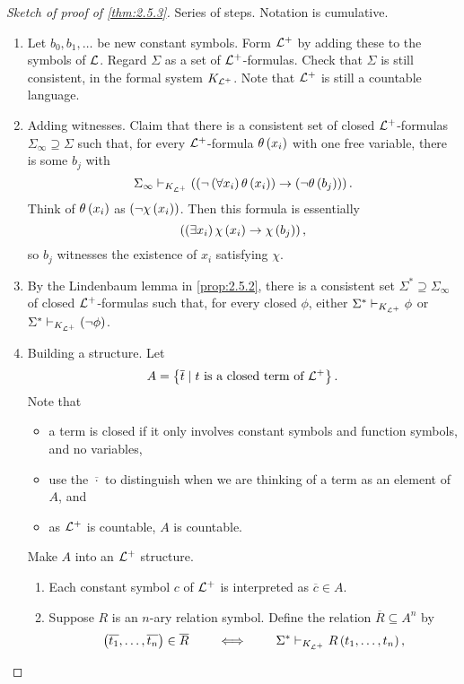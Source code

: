 \begin{proof}[Sketch of proof of \ref{thm:2.5.3}]
Series of steps. Notation is cumulative.
\begin{enumerate}[leftmargin=0.5in, label=Step \arabic*.]
\item Let $ b_0, b_1, \dots $ be new constant symbols. Form $ \mathcal{L}^+ $ by adding these to the symbols of $ \mathcal{L} $. Regard $ \Sigma $ as a set of $ \mathcal{L}^+ $-formulas. Check that $ \Sigma $ is still consistent, in the formal system $ K_{\mathcal{L}^+} $. Note that $ \mathcal{L}^+ $ is still a countable language.
\item Adding witnesses. Claim that there is a consistent set of closed $ \mathcal{L}^+ $-formulas $ \Sigma_\infty \supseteq \Sigma $ such that, for every $ \mathcal{L}^+ $-formula $ \theta\left( x_i \right) $ with one free variable, there is some $ b_j $ with
$$ \Sigma_\infty \vdash_{K_{\mathcal{L}^+}} \left( \left( \neg \left( \forall x_i \right)\theta\left( x_i \right) \right) \rightarrow \left( \neg \theta\left( b_j \right) \right) \right). $$
Think of $ \theta\left( x_i \right) $ as $ \left( \neg \chi\left( x_i \right) \right) $. Then this formula is essentially
$$ \left( \left( \exists x_i \right)\chi\left( x_i \right) \rightarrow \chi\left( b_j \right) \right), $$
so $ b_j $ witnesses the existence of $ x_i $ satisfying $ \chi $.
\item By the Lindenbaum lemma in \ref{prop:2.5.2}, there is a consistent set $ \Sigma^* \supseteq \Sigma_\infty $ of closed $ \mathcal{L}^+ $-formulas such that, for every closed $ \phi $, either $ \Sigma^* \vdash_{K_{\mathcal{L}^+}} \phi $ or $ \Sigma^* \vdash_{K_{\mathcal{L}^+}} \left( \neg \phi \right) $.
\item Building a structure. Let
$$ A = \left\{ \overline{t} \mid t \ \text{is a closed term of} \ \mathcal{L}^+ \right\}. $$
Note that
\begin{itemize}
\item a term is closed if it only involves constant symbols and function symbols, and no variables,
\item use the $ \overline{\cdot} $ to distinguish when we are thinking of a term as an element of $ A $, and
\item as $ \mathcal{L}^+ $ is countable, $ A $ is countable.
\end{itemize}
Make $ A $ into an $ \mathcal{L}^+ $ structure.
\begin{enumerate}
\item Each constant symbol $ c $ of $ \mathcal{L}^+ $ is interpreted as $ \overline{c} \in A $.
\item Suppose $ R $ is an $ n $-ary relation symbol. Define the relation $ \overline{R} \subseteq A^n $ by
$$ \left( \overline{t_1}, \dots, \overline{t_n} \right) \in \overline{R} \qquad \iff \qquad \Sigma^* \vdash_{K_{\mathcal{L}^+}} R\left( t_1, \dots, t_n \right), $$

\end{enumerate}
\end{enumerate}
\end{proof}

